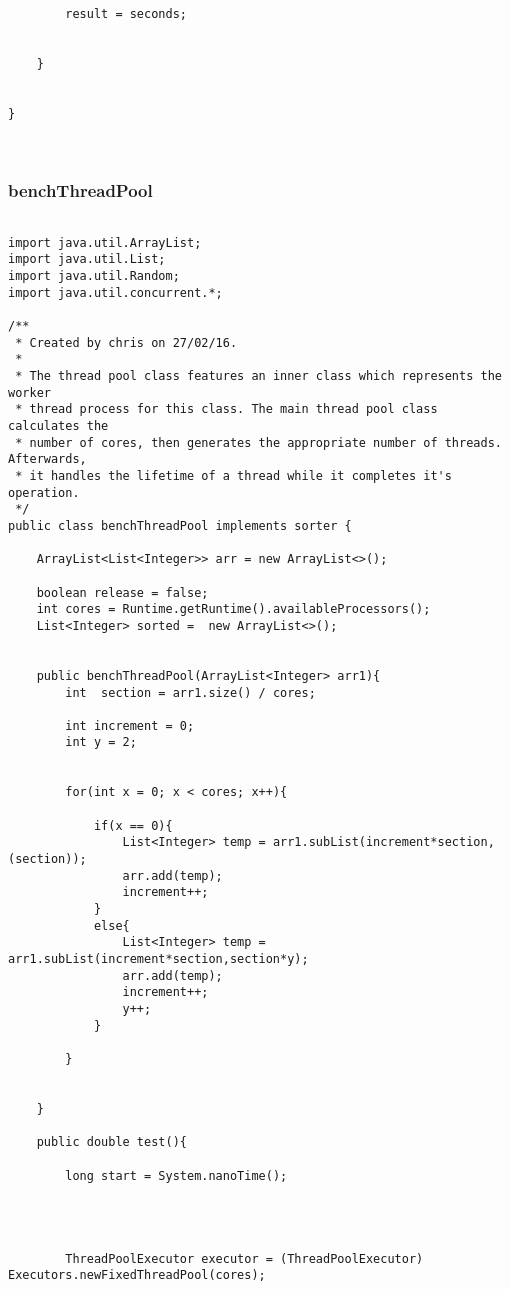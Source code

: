 \documentclass[11pt]{article}  %
\theoremstyle{definition}
\theoremstyle{remark}
\begin{document}
\begin{appendices}
\begin{lstlisting}
        result = seconds;


    }


}



\end{lstlisting}
 
\newpage
\subsubsection{benchThreadPool}\label{1} 
  \begin{lstlisting}

import java.util.ArrayList;
import java.util.List;
import java.util.Random;
import java.util.concurrent.*;

/**
 * Created by chris on 27/02/16.
 *
 * The thread pool class features an inner class which represents the worker
 * thread process for this class. The main thread pool class calculates the
 * number of cores, then generates the appropriate number of threads. Afterwards,
 * it handles the lifetime of a thread while it completes it's operation.
 */
public class benchThreadPool implements sorter {

    ArrayList<List<Integer>> arr = new ArrayList<>();

    boolean release = false;
    int cores = Runtime.getRuntime().availableProcessors();
    List<Integer> sorted =  new ArrayList<>();


    public benchThreadPool(ArrayList<Integer> arr1){
        int  section = arr1.size() / cores;

        int increment = 0;
        int y = 2;


        for(int x = 0; x < cores; x++){

            if(x == 0){
                List<Integer> temp = arr1.subList(increment*section,(section));
                arr.add(temp);
                increment++;
            }
            else{
                List<Integer> temp = arr1.subList(increment*section,section*y);
                arr.add(temp);
                increment++;
                y++;
            }

        }
      

    }

    public double test(){

        long start = System.nanoTime();




        ThreadPoolExecutor executor = (ThreadPoolExecutor) Executors.newFixedThreadPool(cores);


\end{lstlisting}
\end{appendices}
\end{document}
